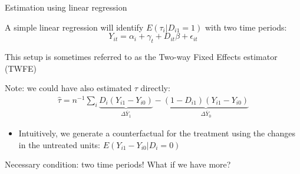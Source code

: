 \documentclass[notes,11pt, aspectratio=169]{beamer}
\newenvironment{wideitemize}{\itemize\addtolength{\itemsep}{10pt}}{\enditemize}
\begin{document}
\begin{frame}{Estimation using linear regression}
  \begin{wideitemize}
  \item A simple linear regression will identify
    $E(\tau_{i} | D_{i1} = 1)$ with two time periods:
    \begin{equation}
      Y_{it} = \alpha_{i}+ \gamma_{t} + D_{it}\beta + \epsilon_{it}
    \end{equation}
  \item This setup is sometimes referred to as the Two-way Fixed Effects estimator (TWFE)
  \item Note: we could have also estimated $\tau$ directly:
    \begin{align*}
      \hat{\tau} = n^{-1}\sum_{i} \underbrace{D_{i}(Y_{i1} - Y_{i0})}_{\Delta \overline{Y}_{1}} - \underbrace{(1-D_{i1})(Y_{i1} - Y_{i0})}_{\Delta \overline{Y}_{0}}
    \end{align*}
    \begin{itemize}
    \item Intuitively, we generate a counterfactual for the treatment
      using the changes in the untreated units: $E(Y_{i1} - Y_{i0} | D_{i}=0)$
    \end{itemize}
  \item Necessary condition: two time periods! What if we have more?
  \end{wideitemize}
\end{frame}
\end{document}
